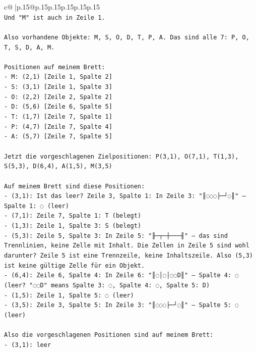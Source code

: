 \documentclass{article}
\begin{document}
{\begin{supertabular}{c@{$\;$}|p{.15\linewidth}@{}p{.15\linewidth}p{.15\linewidth}p{.15\linewidth}p{.15\linewidth}p{.15\linewidth}}
{{{\\ 
\texttt{Und "M" ist auch in Zeile 1.} \\
\\ 
\texttt{Also vorhandene Objekte: M, S, O, D, T, P, A. Das sind alle 7: P, O, T, S, D, A, M.} \\
\\ 
\texttt{Positionen auf meinem Brett:} \\
\texttt{{-} M: (2,1) {[}Zeile 1, Spalte 2{]}} \\
\texttt{{-} S: (3,1) {[}Zeile 1, Spalte 3{]}} \\
\texttt{{-} O: (2,2) {[}Zeile 2, Spalte 2{]}} \\
\texttt{{-} D: (5,6) {[}Zeile 6, Spalte 5{]}} \\
\texttt{{-} T: (1,7) {[}Zeile 7, Spalte 1{]}} \\
\texttt{{-} P: (4,7) {[}Zeile 7, Spalte 4{]}} \\
\texttt{{-} A: (5,7) {[}Zeile 7, Spalte 5{]}} \\
\\ 
\texttt{Jetzt die vorgeschlagenen Zielpositionen: P(3,1), O(7,1), T(1,3), S(5,3), D(6,4), A(1,5), M(3,5)} \\
\\ 
\texttt{Auf meinem Brett sind diese Positionen:} \\
\texttt{{-} (3,1): Ist das leer? Zeile 3, Spalte 1: In Zeile 3: "║◌◌◌├─┘◌║" – Spalte 1: ◌ (leer)} \\
\texttt{{-} (7,1): Zeile 7, Spalte 1: T (belegt)} \\
\texttt{{-} (1,3): Zeile 1, Spalte 3: S (belegt)} \\
\texttt{{-} (5,3): Zeile 5, Spalte 3: In Zeile 5: "╟─┬─┼───╢" – das sind Trennlinien, keine Zelle mit Inhalt. Die Zellen in Zeile 5 sind wohl darunter? Zeile 5 ist eine Trennzeile, keine Inhaltszeile. Also (5,3) ist keine gültige Zelle für ein Objekt.} \\
\texttt{{-} (6,4): Zeile 6, Spalte 4: In Zeile 6: "║◌│◌│◌◌D║" – Spalte 4: ◌ (leer? "◌◌D" means Spalte 3: ◌, Spalte 4: ◌, Spalte 5: D)} \\
\texttt{{-} (1,5): Zeile 1, Spalte 5: ◌ (leer)} \\
\texttt{{-} (3,5): Zeile 3, Spalte 5: In Zeile 3: "║◌◌◌├─┘◌║" – Spalte 5: ◌ (leer)} \\
\\ 
\texttt{Also die vorgeschlagenen Positionen sind auf meinem Brett:} \\
\texttt{{-} (3,1): leer} \\
}}}
\end{supertabular}}
\end{document}
